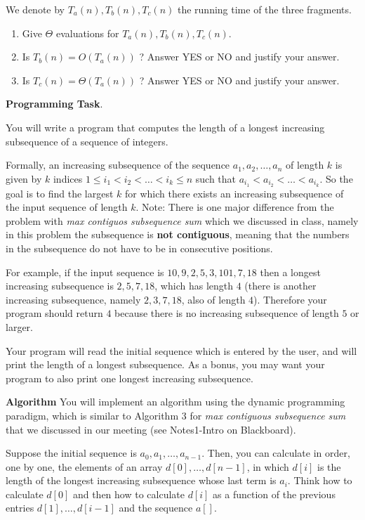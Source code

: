 \documentclass[11pt]{article}
\begin{document}
We denote by $T_a(n), T_b(n), T_c(n)$ the running time of the three fragments.

\begin{enumerate}
\item  Give $\Theta$ evaluations for   $T_a(n), T_b(n), T_c(n)$.
\item Is  $T_b(n)  = O(T_a(n))$ ? Answer YES or NO and justify your answer.
\item  Is $T_c(n) = \Theta (T_a(n))$ ?  Answer YES or NO and justify your answer.
 

\end{enumerate}

\newpage
\textbf{Programming Task}. 

You will write a program that computes the length of a longest increasing subsequence of a sequence of integers. 

Formally, an increasing subsequence of the sequence $a_1, a_2, \ldots, a_n$ of length $k$ is given by $k$ indices $1 \leq i_1 < i_2 < \ldots < i_k \leq n$ such that $a_{i_1} < a_{i_2} < \ldots < a_{i_k}$. So the goal is to find the largest $k$ for which there exists an increasing subsequence of the input sequence of length $k$. Note: There is one major difference from the problem with \emph{max contiguos subsequence sum} which we discussed in class, namely in this problem  the subsequence is \textbf{not contiguous}, meaning that the numbers in the subsequence do not have to be in consecutive positions.

For example, if the input sequence is $10, 9, 2, 5, 3, 101, 7, 18$ then a longest increasing subsequence is $2,5,7, 18$, which has length $4$ (there is another increasing subsequence, namely $2,3,7,18$, also of length $4$). Therefore your program should return $4$ because there is no increasing subsequence of length $5$ or larger.

Your program will read the initial sequence which is entered by the user, and will print the length of a longest subsequence.  As a bonus, you may want your program to also print one longest increasing subsequence.
\smallskip

\textbf{Algorithm}  You will implement an algorithm using the dynamic programming paradigm, which is similar to Algorithm 3 for \emph{max contiguous subsequence sum} that we discussed in our meeting
 (see  Notes1-Intro on Blackboard).

 Suppose  the initial sequence is $a_0, a_1, \ldots, a_{n-1}$. Then,  you can calculate  in order, one by one,  the elements of an array $d[0], \ldots, d[n-1]$,  in which $d[i]$ is the length of the longest increasing subsequence whose last term is $a_i$. 
Think how to calculate $d[0]$ and then how to calculate $d[i]$ as a function of the previous entries $d[1],  \dots, d[i-1]$ and the sequence $a[]$.  %
\medskip
\end{document}
